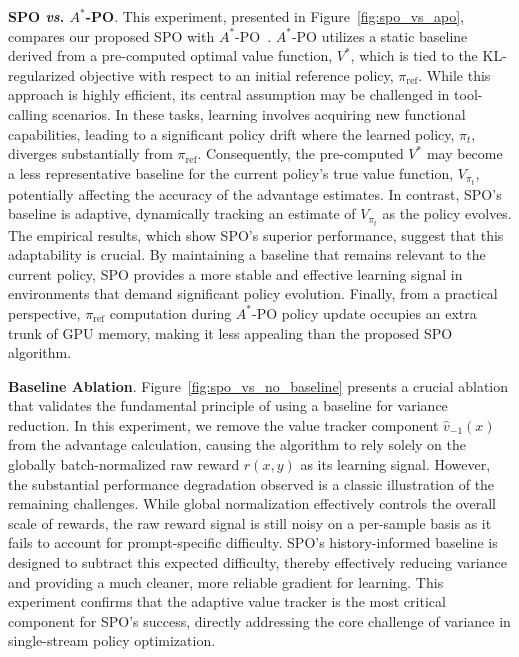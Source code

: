 \textbf{SPO \emph{vs}. $A^*$-PO}. This experiment, presented in Figure~\ref{fig:spo_vs_apo}, compares our proposed SPO with $A^*$-PO~\cite{brantley2025accelerating}. $A^*$-PO utilizes a static baseline derived from a pre-computed optimal value function, $V^*$, which is tied to the KL-regularized objective with respect to an initial reference policy, $\pi_{\text{ref}}$. While this approach is highly efficient, its central assumption may be challenged in tool-calling scenarios. In these tasks, learning involves acquiring new functional capabilities, leading to a significant policy drift where the learned policy, $\pi_t$, diverges substantially from $\pi_{\text{ref}}$. Consequently, the pre-computed $V^*$ may become a less representative baseline for the current policy's true value function, $V_{\pi_t}$, potentially affecting the accuracy of the advantage estimates. In contrast, SPO's baseline is adaptive, dynamically tracking an estimate of $V_{\pi_t}$ as the policy evolves. The empirical results, which show SPO's superior performance, suggest that this adaptability is crucial. By maintaining a baseline that remains relevant to the current policy, SPO provides a more stable and effective learning signal in environments that demand significant policy evolution. Finally, from a practical perspective, $\pi_\text{ref}$ computation during $A^*$-PO policy update occupies an extra trunk of GPU memory, making it less appealing than the proposed SPO algorithm.

\textbf{Baseline Ablation}. Figure~\ref{fig:spo_vs_no_baseline} presents a crucial ablation that validates the fundamental principle of using a baseline for variance reduction. In this experiment, we remove the value tracker component $\hat{v}_{-1}(x)$ from the advantage calculation, causing the algorithm to rely solely on the globally batch-normalized raw reward $r(x,y)$ as its learning signal. However, the substantial performance degradation observed is a classic illustration of the remaining challenges. While global normalization effectively controls the overall scale of rewards, the raw reward signal is still noisy on a per-sample basis as it fails to account for prompt-specific difficulty. SPO's history-informed baseline is designed to subtract this expected difficulty, thereby effectively reducing variance and providing a much cleaner, more reliable gradient for learning. This experiment confirms that the adaptive value tracker is the most critical component for SPO's success, directly addressing the core challenge of variance in single-stream policy optimization.

